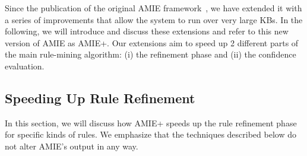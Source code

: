 Since the publication of the original AMIE framework~\cite{amie}, we have extended it with a series of improvements
that allow the system to run over very large KBs.
In the following, we will introduce and discuss these extensions and refer to this new version of AMIE as AMIE+.
Our extensions aim to speed up 2 different parts of the main rule-mining algorithm: (i) the refinement phase and
(ii) the confidence evaluation.







\subsection{Speeding Up Rule Refinement}
\label{subsec:lossless}
In this section, we will discuss how AMIE+ speeds up the rule refinement phase for specific kinds of rules.
We emphasize that the techniques described below do not alter AMIE's output in any way.

